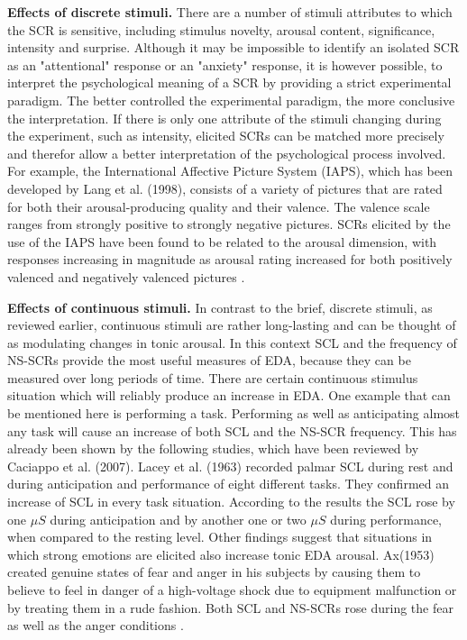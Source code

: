 \textbf{Effects of discrete stimuli.} There are a number of stimuli attributes to which the SCR is sensitive, including stimulus novelty, arousal content, significance, intensity and surprise. Although it may be impossible to identify an isolated SCR as an "attentional" response or an "anxiety" response, it is however possible, to interpret the psychological meaning of a SCR by providing a strict experimental paradigm. The better controlled the experimental paradigm, the more conclusive the interpretation. If there is only one attribute of the stimuli changing during the experiment, such as intensity, elicited SCRs can be matched more precisely and therefor allow a better interpretation of the psychological process involved. For example, the International Affective Picture System (IAPS), which has been developed by Lang et al. (1998), consists of a variety of pictures that are rated for both their arousal-producing quality and their valence. The valence scale ranges from strongly positive to strongly negative pictures. SCRs elicited by the use of the IAPS have been found to be related to the arousal dimension, with responses increasing  in magnitude as arousal rating increased for both positively valenced and negatively valenced pictures \cite{HANDBOOKPP}.

\textbf{Effects of continuous stimuli.} In contrast to the brief, discrete stimuli, as reviewed earlier, continuous stimuli are rather long-lasting and can be thought of as modulating changes in tonic arousal. In this context SCL and the frequency of NS-SCRs provide the most useful measures of EDA, because they can be measured over long periods of time. There are certain continuous stimulus situation which will reliably produce an increase in EDA. One example that can be mentioned here is performing a task. Performing as well as anticipating almost any task will cause an increase of both SCL and the NS-SCR frequency. This has already been shown by the following studies, which have been reviewed by Caciappo et al. (2007). Lacey et al. (1963) recorded palmar SCL during rest and during anticipation and performance of eight different tasks. They confirmed an increase of SCL in every task situation. According to the results the SCL rose by one $\mu S$ during anticipation and by another one or two $\mu S$ during performance, when compared to the resting level. Other findings suggest that situations in which strong emotions are elicited also increase tonic EDA arousal. Ax(1953) created genuine states of fear and anger in his subjects by causing them to believe to feel in danger of a high-voltage shock due to equipment malfunction or by treating them in a rude fashion. Both SCL and NS-SCRs rose during the fear as well as the anger conditions \cite{HANDBOOKPP}. \\

